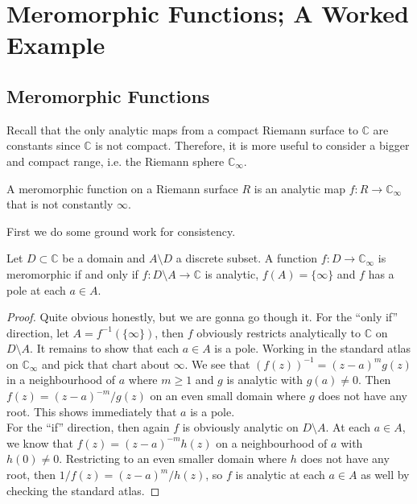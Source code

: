 \section{Meromorphic Functions; A Worked Example}
\subsection{Meromorphic Functions}
Recall that the only analytic maps from a compact Riemann surface to $\mathbb C$ are constants since $\mathbb C$ is not compact.
Therefore, it is more useful to consider a bigger and compact range, i.e. the Riemann sphere $\mathbb C_\infty$.
\begin{definition}
    A meromorphic function on a Riemann surface $R$ is an analytic map $f:R\to\mathbb C_\infty$ that is not constantly $\infty$.
\end{definition}
First we do some ground work for consistency.
\begin{proposition}
    Let $D\subset\mathbb C$ be a domain and $A\setminus D$ a discrete subset.
    A function $f:D\to\mathbb C_\infty$ is meromorphic if and only if $f:D\setminus A\to\mathbb C$ is analytic, $f(A)=\{\infty\}$ and $f$ has a pole at each $a\in A$.
\end{proposition}
\begin{proof}
    Quite obvious honestly, but we are gonna go though it.
    For the ``only if'' direction, let $A=f^{-1}(\{\infty\})$, then $f$ obviously restricts analytically to $\mathbb C$ on $D\setminus A$.
    It remains to show that each $a\in A$ is a pole.
    Working in the standard atlas on $\mathbb C_\infty$ and pick that chart about $\infty$.
    We see that $(f(z))^{-1}=(z-a)^mg(z)$ in a neighbourhood of $a$ where $m\ge 1$ and $g$ is analytic with $g(a)\neq 0$.
    Then $f(z)=(z-a)^{-m}/g(z)$ on an even small domain where $g$ does not have any root.
    This shows immediately that $a$ is a pole.\\
    For the ``if'' direction, then again $f$ is obviously analytic on $D\setminus A$.
    At each $a\in A$, we know that $f(z)=(z-a)^{-m}h(z)$ on a neighbourhood of $a$ with $h(0)\neq 0$.
    Restricting to an even smaller domain where $h$ does not have any root, then $1/f(z)=(z-a)^m/h(z)$, so $f$ is analytic at each $a\in A$ as well by checking the standard atlas.
\end{proof}